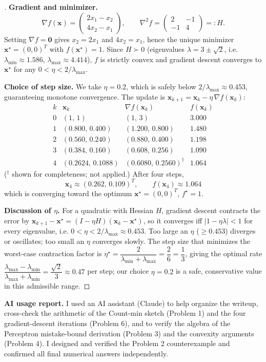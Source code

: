 \documentclass[en,hazy,blue,12pt,normal]{../../elegantnote}
\begin{document}
\begin{proof}[\solutionname]
\textbf{Gradient and minimizer.}
\[
\nabla f(\bm x)=\begin{pmatrix}2x_1-x_2\\ 4x_2-x_1\end{pmatrix},
\qquad
\nabla^2 f=\begin{pmatrix}2&-1\\-1&4\end{pmatrix}=:H .
\]
Setting $\nabla f=\bm 0$ gives $x_2=2x_1$ and $4x_2=x_1$, hence the unique minimizer
$\bm x^\star=(0,0)^T$ with $f(\bm x^\star)=1$. Since $H\succ 0$ (eigenvalues
$\lambda=3\pm\sqrt2$, i.e. $\lambda_{\min}\approx1.586$, $\lambda_{\max}\approx4.414$), $f$ is
strictly convex and gradient descent converges to $\bm x^\star$ for any $0<\eta<2/\lambda_{\max}$.

\medskip
\textbf{Choice of step size.} We take $\eta=0.2$, which is safely below
$2/\lambda_{\max}\approx0.453$, guaranteeing monotone convergence. The update is
$\bm x_{k+1}=\bm x_k-\eta\,\nabla f(\bm x_k)$:
\[
\begin{array}{c|c|c|c}
k & \bm x_k & \nabla f(\bm x_k) & f(\bm x_k)\\\hline
0 & (1,\,1) & (1,\,3) & 3.000\\
1 & (0.800,\,0.400) & (1.200,\,0.800) & 1.480\\
2 & (0.560,\,0.240) & (0.880,\,0.400) & 1.198\\
3 & (0.384,\,0.160) & (0.608,\,0.256) & 1.090\\
4 & (0.2624,\,0.1088) & (0.6080,\,0.2560)^{\dagger} & 1.064
\end{array}
\]
($^\dagger$ shown for completeness; not applied.) After four steps,
\[
\boxed{\ \bm x_4\approx(0.262,\,0.109)^T,\qquad f(\bm x_4)\approx 1.064\ }
\]
which is converging toward the optimum $\bm x^\star=(0,0)^T$, $f^\star=1$.

\medskip
\textbf{Discussion of $\eta$.} For a quadratic with Hessian $H$, gradient descent contracts the error
by $\bm x_{k+1}-\bm x^\star=(I-\eta H)(\bm x_k-\bm x^\star)$, so it converges iff
$|1-\eta\lambda|<1$ for every eigenvalue, i.e. $0<\eta<2/\lambda_{\max}\approx0.453$. Too large an
$\eta$ ($\ge0.453$) diverges or oscillates; too small an $\eta$ converges slowly. The step size that
minimizes the worst-case contraction factor is
$\eta^\star=\dfrac{2}{\lambda_{\min}+\lambda_{\max}}=\dfrac{2}{6}=\dfrac13$, giving the optimal rate
$\dfrac{\lambda_{\max}-\lambda_{\min}}{\lambda_{\max}+\lambda_{\min}}=\dfrac{\sqrt2}{3}\approx0.47$
per step; our choice $\eta=0.2$ is a safe, conservative value in this admissible range.
\end{proof}

\bigskip
\noindent\textbf{AI usage report.} I used an AI assistant (Claude) to help organize the writeup,
cross-check the arithmetic of the Count-min sketch (Problem 1) and the four gradient-descent
iterations (Problem 6), and to verify the algebra of the Perceptron mistake-bound derivation
(Problem 3) and the convexity arguments (Problem 4). I designed and verified the Problem 2
counterexample and confirmed all final numerical answers independently.
\end{document}
